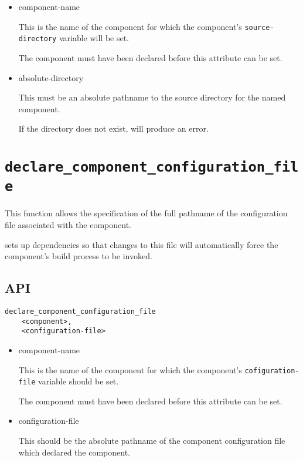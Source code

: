 \begin{itemize}
\item component-name

  This is the name of the component for which the component's
  \texttt{source-directory} variable will be set.

  The component must have been declared before this attribute can be
  set.

\item absolute-directory

  This must be an absolute pathname to the source directory for the
  named component.

  If the directory does not exist, \lmsbw will produce an error.
\end{itemize}

\section{\texttt{declare\_component\_configuration\_file}}\label{api:configuration-file}

This function allows the specification of the full pathname of the
configuration file associated with the component.

\lmsbw sets up dependencies so that changes to this file will
automatically force the component's build process to be invoked.

\subsection{API}

\begin{verbatim}
declare_component_configuration_file
    <component>,
    <configuration-file>
\end{verbatim}

\begin{itemize}
\item component-name

  This is the name of the component for which the component's
  \texttt{cofiguration-file} variable should be set.

  The component must have been declared before this attribute can be
  set.

\item configuration-file

  This should be the absolute pathname of the component configuration
  file which declared the component.

\end{itemize}

